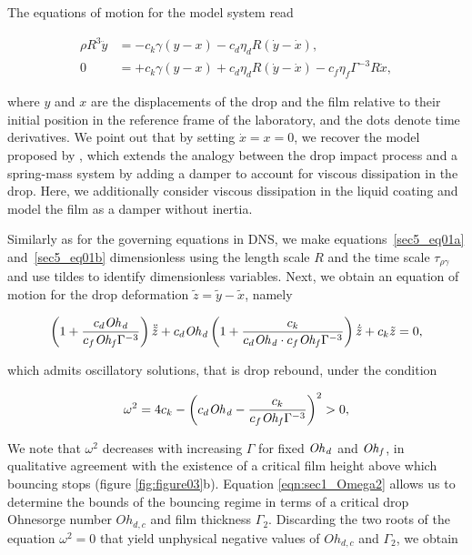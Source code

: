 The equations of motion for the model system read

\begin{align}
	\rho R^{3} \ddot{y} &= -c_{k} \gamma \left( y - x \right) - c_{d} \eta_{d} R \left( \dot{y} - \dot{x} \right), \label{sec5_eq01a} \\
	0 &= +c_{k} \gamma \left( y - x \right) + c_{d} \eta_{d} R \left( \dot{y} - \dot{x} \right) - c_{f} \eta_{f} \Gamma^{-3} R \dot{x}, \label{sec5_eq01b}
\end{align}

\noindent where $y$ and $x$ are the displacements of the drop and the film relative to their initial position in the reference frame of the laboratory, and the dots denote time derivatives. We point out that by setting $\dot{x} = x = 0$, we recover the model proposed by \citet{jha2020viscous}, which extends the analogy between the drop impact process and a spring-mass system \citep{okumura2003water, biance2006} by adding a damper to account for viscous dissipation in the drop. Here, we additionally consider viscous dissipation in the liquid coating and model the film as a damper without inertia.

Similarly as for the governing equations in DNS, we make equations~\eqref{sec5_eq01a} and~\eqref{sec5_eq01b} dimensionless using the length scale $R$ and the time scale $\tau_{\rho\gamma}$ and use tildes to identify dimensionless variables. Next, we obtain an equation of motion for the drop deformation $\tilde{z} = \tilde{y} - \tilde{x}$, namely

\begin{align}
	\left( 1 + \frac{c_{d} \mathit{Oh}_\mathit{d}}{c_{f} \mathit{Oh}_\mathit{f} \Gamma^{-3}} \right) \ddot{\tilde{z}} + c_{d} \mathit{Oh}_\mathit{d} \left( 1 + \frac{c_{k}}{c_{d} \mathit{Oh}_\mathit{d} \cdot c_{f} \mathit{Oh}_\mathit{f} \Gamma^{-3}} \right) \dot{\tilde{z}} + c_{k} \tilde{z} = 0, \label{sec5_eq02}
\end{align}

\noindent which admits oscillatory solutions, that is drop rebound, under the condition

\begin{align}
	\omega^2 = 4 c_{k} - \left( c_{d} \mathit{Oh}_\mathit{d}  - \dfrac{c_{k}}{c_{f} \mathit{Oh}_\mathit{f} \Gamma^{-3}} \right)^{2} > 0,
	\label{eqn:sec1_Omega2}
\end{align}

\noindent We note that $\omega^2$ decreases with increasing $\Gamma$ for fixed $\mathit{Oh}_\mathit{d}$ and $\mathit{Oh}_\mathit{f}$, in qualitative agreement with the existence of a critical film height above which bouncing stops (figure \ref{fig:figure03}b). Equation \eqref{eqn:sec1_Omega2} allows us to determine the bounds of the bouncing regime in terms of a critical drop Ohnesorge number $Oh_{d,c}$ and film thickness $\Gamma_2$. Discarding the two roots of the equation $\omega^2 = 0$ that yield unphysical negative values of $Oh_{d,c}$ and $\Gamma_2$, we obtain


